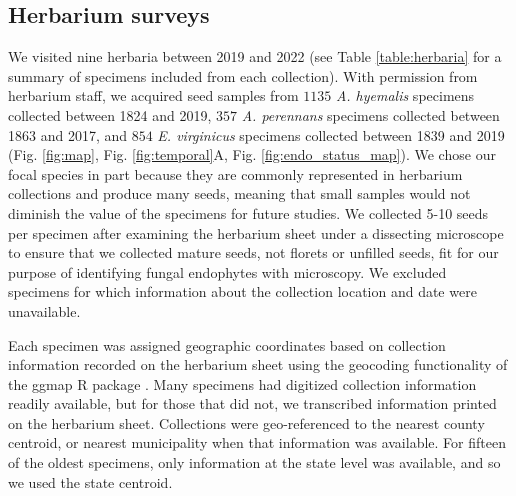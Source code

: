 \documentclass[11pt]{article}
\newcommand{\firstrevise}[1]{{\color{black}{#1}}}
\begin{document}
		\subsection*{Herbarium surveys}
We visited nine herbaria between 2019 and 2022 (see Table \ref{table:herbaria} for a summary of specimens included from each collection). 
With permission from herbarium staff, we acquired seed samples from $1135$ \emph{A. hyemalis} specimens collected between 1824 and 2019, $357$ \emph{A. perennans} specimens collected between 1863 and 2017, and $854$ \emph{E. virginicus} specimens collected between 1839 and 2019 (Fig. \ref{fig:map}, Fig. \ref{fig:temporal}A, Fig. \ref{fig:endo_status_map}).
We chose our focal species in part because they are commonly represented in herbarium collections and produce many seeds, meaning that small samples would not diminish the value of the specimens for future studies. 
We collected 5-10 seeds per specimen after examining the herbarium sheet under a dissecting microscope to ensure that we collected mature seeds, not florets or unfilled seeds, fit for our purpose of identifying fungal endophytes with microscopy.
We excluded specimens for which information about the collection location and date were unavailable.

Each specimen was assigned geographic coordinates based on collection information recorded on the herbarium sheet using the geocoding functionality of the ggmap R package \citep{kahle2019package}.
Many specimens had digitized collection information readily available, but for those that did not, we transcribed information printed on the herbarium sheet. 
Collections were geo-referenced to the nearest county centroid, or nearest municipality when that information was available. 
For fifteen of the oldest specimens, only information at the state level was available, and so we used the state centroid.
\linelabel{R2C24-begin}\firstrevise{The median pairwise distance between georeferenced coordinate points was 841 km.
The median longitudinal width of the bounding boxes generated to geocode municipality, county, or state centroids was 44.7 km. 
Among those specimens geo-referenced at the state level, the largest bounding box, spanning the state of Texas, was 1233 km wide.
The smallest bounding boxes were less than 1 km across for small municipalities (while this suggests high precision, we note that some specimens were collected in natural habitat nearby to small municipalities not encompassed by these bounding boxes).}
\end{document}
